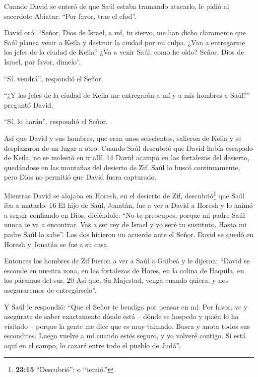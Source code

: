 Cuando David se enteró de que Saúl estaba tramando
atacarlo, le pidió al sacerdote Abiatar: ``Por favor, trae el efod''.

 David oró: ``Señor, Dios de Israel, a mí, tu siervo, me
han dicho claramente que Saúl planea venir a Keila y destruir la ciudad
por mi culpa.  ¿Van a entregarme los jefes de la ciudad de
Keila? ¿Va a venir Saúl, como he oído? Señor, Dios de Israel, por favor,
dímelo''.

``Sí, vendrá'', respondió el Señor.

 ``¿Y los jefes de la ciudad de Keila me entregarán a mí y
a mis hombres a Saúl?'' preguntó David.

``Sí, lo harán'', respondió el Señor.

 Así que David y sus hombres, que eran unos seiscientos,
salieron de Keila y se desplazaron de un lugar a otro. Cuando Saúl
descubrió que David había escapado de Keila, no se molestó en ir allí.
14 David acampó en las fortalezas del desierto, quedándose en las
montañas del desierto de Zif. Saúl lo buscó continuamente, pero Dios no
permitió que David fuera capturado.

 Mientras David se alojaba en Horesh, en el desierto de
Zif, descubrió\footnote{\textbf{23:15} ``Descubrió'': o ``temió.''} que
Saúl iba a matarlo. 16 El hijo de Saúl, Jonatán, fue a ver a David a
Horesh y lo animó a seguir confiando en Dios, diciéndole: 
``No te preocupes, porque mi padre Saúl nunca te va a encontrar. Vas a
ser rey de Israel y yo seré tu sustituto. Hasta mi padre Saúl lo sabe''.
 Los dos hicieron un acuerdo ante el Señor. David se quedó
en Horesh y Jonatán se fue a su casa.

 Entonces los hombres de Zif fueron a ver a Saúl a Guibeá y
le dijeron: ``David se esconde en nuestra zona, en las fortalezas de
Hores, en la colina de Haquila, en los páramos del sur. 20 Así que, Su
Majestad, venga cuando quiera, y nos aseguraremos de entregárselo''.

 Y Saúl le respondió: ``Que el Señor te bendiga por pensar
en mí.  Por favor, ve y asegúrate de saber exactamente
dónde está -- dónde se hospeda y quién lo ha visitado -- porque la gente
me dice que es muy taimado.  Busca y anota todos sus
escondites. Luego vuelve a mí cuando estés seguro, y yo volveré contigo.
Si está aquí en el campo, lo cazaré entre todo el pueblo de Judá''.


